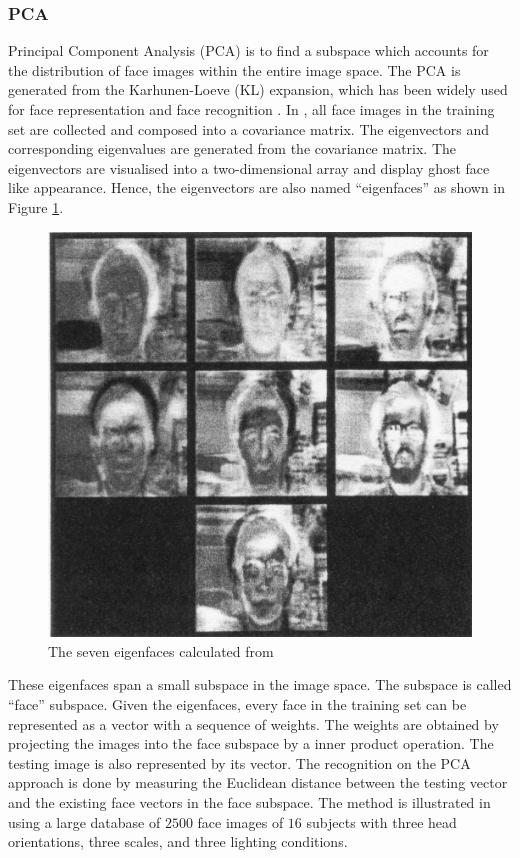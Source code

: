 \subsubsection{PCA}
Principal Component Analysis (PCA) is to find a subspace which accounts for the distribution of face images within the entire image space. The PCA is generated from the Karhunen-Loeve (KL) expansion, which has been widely used for face representation \cite{Kirby1990} and face recognition \cite{Turk1991}. In \cite{Turk1991}, all face images in the training set are collected and composed into a covariance matrix. The eigenvectors and corresponding eigenvalues are generated from the covariance matrix. The eigenvectors are visualised into a two-dimensional array and display ghost face like appearance. Hence, the eigenvectors are also named ``eigenfaces'' as shown in \mbox{Figure} \ref{fig:eigenfacesreview}.
\begin{figure}[ht]
\begin{center}
 \includegraphics[width=0.8\columnwidth]{ch2/figures/seveneigenfaces.jpg}
\caption{The seven eigenfaces calculated from \cite{Turk1991}}
\label{fig:eigenfacesreview}
\end{center}
\end{figure}  
These eigenfaces span a small subspace in the image space. The subspace is called ``face'' subspace. Given the eigenfaces, every face in the training set can be represented as a vector with a sequence of weights. The weights are obtained by projecting the images into the face subspace by a inner product operation. The testing image is also represented by its vector. The recognition on the PCA approach is done by measuring the Euclidean distance between the testing vector and the existing face vectors in the face subspace. The method is illustrated in \cite{Turk1991} using a large database of $2500$ face images of $16$ subjects with three head orientations, three scales, and three lighting conditions. 


